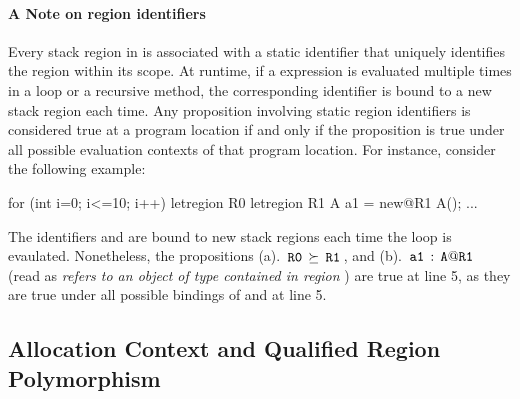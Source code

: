 \paragraph{A Note on region identifiers} Every stack region in \name
is associated with a static identifier that uniquely identifies the
region within its scope. At runtime, if a  expression is
evaluated multiple times in a loop or a recursive method, the
corresponding identifier is bound to a new stack region each time. 
Any proposition involving static region identifiers is
considered true at a program location if and only if the proposition
is true under all possible evaluation contexts of that program
location. For instance, consider the following example:
\begin{numcodejava}
for (int i=0; i<=10; i++) {
  letregion R0 {
    letregion R1 {
      A a1 = new@R1 A();
      ...
    }
  }
}
\end{numcodejava}
The identifiers  and  are bound to new stack regions each
time the loop is evaulated. Nonetheless, the propositions (a). $\,{\tt R0}\,
\succeq \,{\tt R1}\,$, and (b). $\,{\tt a1}\,:\,{\tt A@R1}\,$ (read as \emph{
refers to an object of type  contained in region }) are
true at line 5, as they are true under all possible bindings of 
and  at line 5.


\subsection{Allocation Context and Qualified Region Polymorphism}
\label{sec:alloc-ctxt}

